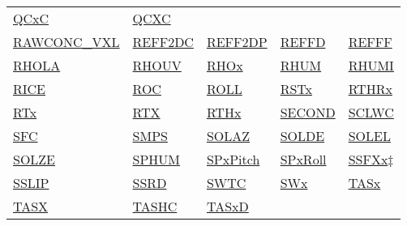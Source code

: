 \documentclass[
  english,
]{book}
\begin{document}
\begin{longtable}[]{@{}lllll@{}}
\href{./the-state-of-the-atmosphere.html\#qcx}{QCxC} &
\href{./the-state-of-the-atmosphere.html\#qcx}{QCXC} & \\
\href{./the-state-of-the-atmosphere.html\#vcsel-uncor}{RAWCONC\_VXL} &
\href{./cloud-physics-variables.html\#reff2d}{REFF2DC} &
\href{./cloud-physics-variables.html\#reff2d}{REFF2DP} &
\href{./cloud-physics-variables.html\#effective-radius}{REFFD} &
\href{./cloud-physics-variables.html\#effective-radius}{REFFF} \\
\href{./the-state-of-the-atmosphere.html\#rho}{RHOLA} &
\href{./the-state-of-the-atmosphere.html\#rho}{RHOUV} &
\href{./the-state-of-the-atmosphere.html\#rho}{RHOx} &
\href{./the-state-of-the-atmosphere.html\#rhumw}{RHUM} &
\href{./the-state-of-the-atmosphere.html\#rhumi}{RHUMI} \\
\href{./cloud-physics-variables.html\#rice}{RICE} &
\href{./the-state-of-the-aircraft.html\#roc}{ROC} &
\href{./the-state-of-the-aircraft.html\#roll}{ROLL} &
\href{./radiation-variables.html\#rstx}{RSTx} &
\href{./the-state-of-the-atmosphere.html\#recovery-t}{RTHRx} \\
\href{./the-state-of-the-atmosphere.html\#recovery-t}{RTx} &
\href{./the-state-of-the-atmosphere.html\#recovery-t}{RTX} &
\href{./the-state-of-the-atmosphere.html\#recovery-t}{RTHx} &
\href{./general-information-about-data-files.html\#hms}{SECOND} &
\href{./obsolete-variables.html\#sclwc}{SCLWC} \\
\href{./the-state-of-the-aircraft.html\#sfc}{SFC} &
\href{./aerosol-particle-measurements.html\#special-aerosol}{SMPS} &
\href{./radiation-variables.html\#solaz}{SOLAZ} &
\href{./radiation-variables.html\#solde}{SOLDE} &
\href{./radiation-variables.html\#solel}{SOLEL} \\
\href{./radiation-variables.html\#solze}{SOLZE} &
\href{./the-state-of-the-atmosphere.html\#sphum}{SPHUM} &
\href{./radiation-variables.html\#spx}{SPxPitch} &
\href{./radiation-variables.html\#spx}{SPxRoll} &
\href{./obsolete-variables.html\#akfxx}{SSFXx\(\ddagger\)} \\
\href{./the-state-of-the-atmosphere.html\#sslip}{SSLIP} &
\href{./the-state-of-the-atmosphere.html\#ssrd}{SSRD} &
\href{./obsolete-variables.html\#swtc}{SWTC} &
\href{./obsolete-variables.html\#swx}{SWx} &
\href{./the-state-of-the-atmosphere.html\#true-airspeed}{TASx} \\
\href{./the-state-of-the-atmosphere.html\#true-airspeed}{TASX} &
\href{./the-state-of-the-atmosphere.html\#tashc}{TASHC} &
\href{./the-state-of-the-atmosphere.html\#true-airspeed}{TASxD} &

\end{longtable}
\end{document}
